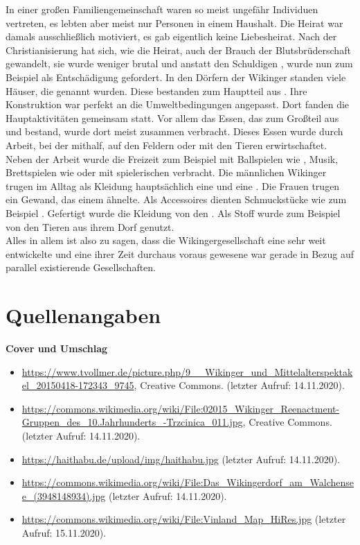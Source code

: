 \documentclass[12pt,a4paper,ngerman,openany]{book}
\newlength{\diebox}
\newcommand{\luecke}[1]{\settowidth{\diebox}{#1}\raisebox{-1.0ex}{\parbox{2.7\diebox}{\dotfill}}}
\begin{document}
In einer großen Familiengemeinschaft waren so meist ungefähr \luecke{50} Individuen vertreten, es lebten aber meist nur \luecke{10 bis 13} Personen in einem Haushalt.
Die Heirat war damals ausschließlich \luecke{strategisch} motiviert, es gab eigentlich keine Liebesheirat.
Nach der Christianisierung hat sich, wie die Heirat, auch der Brauch der Blutsbrüderschaft gewandelt, sie wurde weniger brutal und anstatt den Schuldigen \luecke{umzubringen}, wurde nun zum Beispiel \luecke{Geld} als Entschädigung gefordert.
In den Dörfern der Wikinger standen viele Häuser, die \luecke{Langhäuser} genannt wurden. Diese bestanden zum Hauptteil aus \luecke{Holz}. Ihre Konstruktion war perfekt an die Umweltbedingungen angepasst. Dort fanden die Hauptaktivitäten gemeinsam statt. Vor allem das Essen, das zum Großteil aus \luecke{fleis..}\\
\luecke{lebens.} und \luecke{Getreide} bestand, wurde dort meist zusammen verbracht. Dieses Essen wurde durch Arbeit, bei der \luecke{jeder} mithalf, auf den Feldern oder mit den Tieren erwirtschaftet. Neben der Arbeit wurde die Freizeit zum Beispiel mit Ballspielen wie \luecke{knattl.}, Musik, Brettspielen wie \luecke{Müh.} oder mit spielerischen \luecke{Kämpfen} verbracht.
Die männlichen Wikinger trugen im Alltag als Kleidung hauptsächlich eine \luecke{Tu..} und eine \luecke{Hose}. Die Frauen trugen ein Gewand, das einem \luecke{Kleid} ähnelte. Als Accessoires dienten Schmuckstücke wie zum Beispiel \luecke{Bro.}
\luecke{sch}. Gefertigt wurde die Kleidung von den \luecke{Fraue.........}. Als Stoff wurde zum Beispiel \luecke{Wolle} von den Tieren aus ihrem Dorf genutzt.
\\
Alles in allem ist also zu sagen, dass die Wikingergesellschaft eine sehr weit entwickelte und eine ihrer Zeit durchaus voraus gewesene war gerade in Bezug auf parallel existierende Gesellschaften.


\newpage %
\section{Quellenangaben}
\textbf{Cover und Umschlag}
\begin{itemize}
  \item \url{https://www.tvollmer.de/picture.php/9__Wikinger_und_Mittelalterspektakel_20150418-172343_9745}, Creative Commons. (letzter Aufruf: 14.11.2020).
  \item \url{https://commons.wikimedia.org/wiki/File:02015_Wikinger_Reenactment-Gruppen_des_10.Jahrhunderts_-Trzcinica_011.jpg}, Creative Commons. (letzter Aufruf: 14.11.2020).
  \item \url{https://haithabu.de/upload/img/haithabu.jpg} (letzter Aufruf: 14.11.2020).
  \item \url{https://commons.wikimedia.org/wiki/File:Das_Wikingerdorf_am_Walchensee_(3948148934).jpg} (letzter Aufruf: 14.11.2020).
  \item \url{https://commons.wikimedia.org/wiki/File:Vinland_Map_HiRes.jpg} (letzter Aufruf: 15.11.2020).
\end{itemize}
\end{document}
